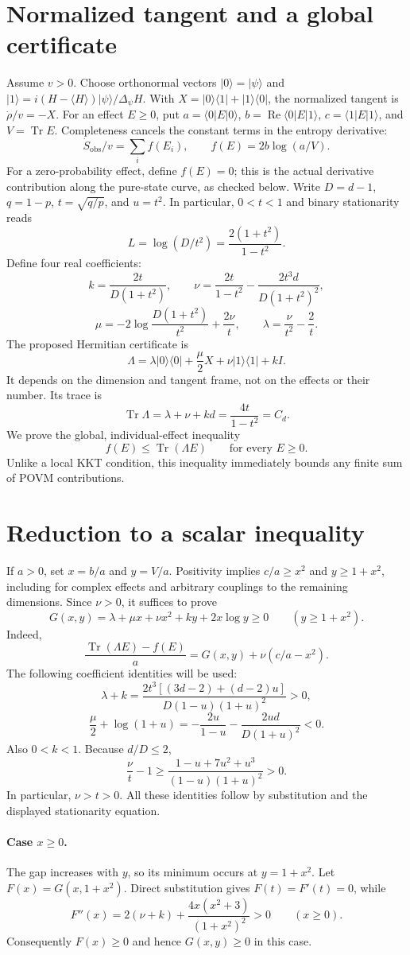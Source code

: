 \documentclass[11pt,a4paper]{article}
\newcommand{\Tr}{\operatorname{Tr}}
\begin{document}
\section*{Normalized tangent and a global certificate}
Assume $v>0$. Choose orthonormal vectors $|0\rangle=|\psi\rangle$ and $|1\rangle=i(H-\langle H\rangle)|\psi\rangle/\Delta_\psi H$. With $X=|0\rangle\langle1|+|1\rangle\langle0|$, the normalized tangent is $\dot\rho/v=-X$. For an effect $E\ge0$, put $a=\langle0|E|0\rangle$, $b=\operatorname{Re}\langle0|E|1\rangle$, $c=\langle1|E|1\rangle$, and $V=\Tr E$. Completeness cancels the constant terms in the entropy derivative:
\[\dot S_{\mathrm{obs}}/v=\sum_i f(E_i),\qquad f(E)=2b\log(a/V).\]
For a zero-probability effect, define $f(E)=0$; this is the actual derivative contribution along the pure-state curve, as checked below.
Write $D=d-1$, $q=1-p$, $t=\sqrt{q/p}$, and $u=t^2$. In particular, $0<t<1$ and binary stationarity reads
\[L=\log(D/t^2)=\frac{2(1+t^2)}{1-t^2}.\]
Define four real coefficients:
\[k=\frac{2t}{D(1+t^2)},\qquad \nu=\frac{2t}{1-t^2}-\frac{2t^3d}{D(1+t^2)^2},\]
\[\mu=-2\log\frac{D(1+t^2)}{t^2}+\frac{2\nu}{t},\qquad \lambda=\frac{\nu}{t^2}-\frac2t.\]
The proposed Hermitian certificate is
\[\Lambda=\lambda|0\rangle\langle0|+\frac{\mu}{2}X+\nu|1\rangle\langle1|+kI.\]
It depends on the dimension and tangent frame, not on the effects or their number. Its trace is
\[\Tr\Lambda=\lambda+\nu+kd=\frac{4t}{1-t^2}=C_d.\]
We prove the global, individual-effect inequality
\[f(E)\le\Tr(\Lambda E)\qquad\text{for every }E\ge0.\]
Unlike a local KKT condition, this inequality immediately bounds any finite sum of POVM contributions.
\section*{Reduction to a scalar inequality}
If $a>0$, set $x=b/a$ and $y=V/a$. Positivity implies $c/a\ge x^2$ and $y\ge1+x^2$, including for complex effects and arbitrary couplings to the remaining dimensions. Since $\nu>0$, it suffices to prove
\[G(x,y)=\lambda+\mu x+\nu x^2+ky+2x\log y\ge0\qquad(y\ge1+x^2).\]
Indeed,
\[\frac{\Tr(\Lambda E)-f(E)}a=G(x,y)+\nu(c/a-x^2).\]
The following coefficient identities will be used:
\[\lambda+k=\frac{2t^3[(3d-2)+(d-2)u]}{D(1-u)(1+u)^2}>0,\]
\[\frac{\mu}{2}+\log(1+u)=-\frac{2u}{1-u}-\frac{2ud}{D(1+u)^2}<0.\]
Also $0<k<1$. Because $d/D\le2$,
\[\frac{\nu}{t}-1\ge\frac{1-u+7u^2+u^3}{(1-u)(1+u)^2}>0.\]
In particular, $\nu>t>0$. All these identities follow by substitution and the displayed stationarity equation.
\paragraph{Case $x\ge0$.} The gap increases with $y$, so its minimum occurs at $y=1+x^2$. Let $F(x)=G(x,1+x^2)$. Direct substitution gives $F(t)=F'(t)=0$, while
\[F''(x)=2(\nu+k)+\frac{4x(x^2+3)}{(1+x^2)^2}>0\qquad(x\ge0).\]
Consequently $F(x)\ge0$ and hence $G(x,y)\ge0$ in this case.
\end{document}
